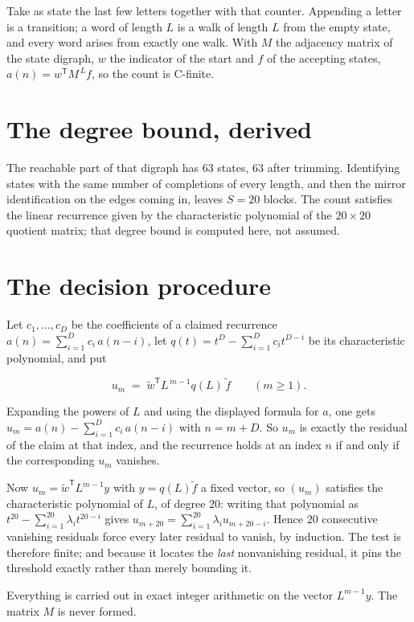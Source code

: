 \documentclass[11pt]{article}
\theoremstyle{definition}
\begin{document}
Take as state the last few letters together with that counter. Appending a letter is a transition; a word of length $L$ is a walk of length $L$ from the empty state, and every word arises from exactly one walk. With $M$ the adjacency matrix of the state digraph, $w$ the indicator of the start and $f$ of the accepting states, $a(n) = w^{\mathsf T}M^{\,L}f$, so the count is C-finite.

\section{The degree bound, derived}

The reachable part of that digraph has $63$ states, $63$ after trimming. Identifying states with the same number of completions of every length, and then the mirror identification on the edges coming in, leaves $S = 20$ blocks. The count satisfies the linear recurrence given by the characteristic polynomial of the $20\times20$ quotient matrix; that degree bound is computed here, not assumed.

\section{The decision procedure}

Let $c_1,\dots,c_D$ be the coefficients of a claimed recurrence $a(n) = \sum_{i=1}^{D} c_i\,a(n-i)$, let $q(t) = t^{D} - \sum_{i=1}^{D} c_i t^{D-i}$ be its characteristic polynomial, and put

\[u_m \;=\; \tilde w^{\mathsf T} L^{\,m-1} q(L)\,\tilde f \qquad (m \ge 1).\]

Expanding the powers of $L$ and using the displayed formula for $a$, one gets $u_m = a(n) - \sum_{i=1}^{D} c_i\,a(n-i)$ with $n = m + D$. So $u_m$ is exactly the residual of the claim at that index, and the recurrence holds at an index $n$ if and only if the corresponding $u_m$ vanishes.

Now $u_m = \tilde w^{\mathsf T} L^{m-1} y$ with $y = q(L)\tilde f$ a fixed vector, so $(u_m)$ satisfies the characteristic polynomial of $L$, of degree $20$: writing that polynomial as $t^{20} - \sum_{i=1}^{20} \lambda_i t^{20-i}$ gives $u_{m+20} = \sum_{i=1}^{20} \lambda_i u_{m+20-i}$. Hence $20$ consecutive vanishing residuals force every later residual to vanish, by induction. The test is therefore finite; and because it locates the {\itshape last} nonvanishing residual, it pins the threshold exactly rather than merely bounding it.

Everything is carried out in exact integer arithmetic on the vector $L^{m-1}y$. The matrix $M$ is never formed.
\end{document}
